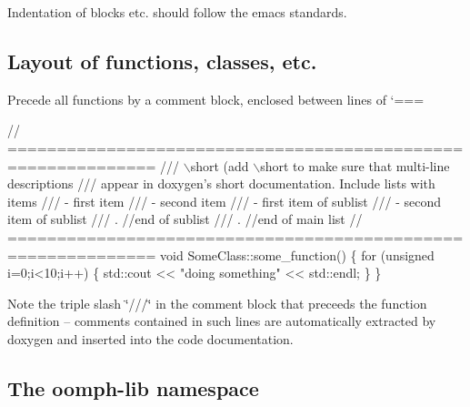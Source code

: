 \begin{DoxyItemize}
\item Indentation of blocks etc. should follow the emacs standards.
\end{DoxyItemize}\hypertarget{index_layout_functions_etc}{}\subsection{Layout of functions, classes, etc.}\label{index_layout_functions_etc}

\begin{DoxyItemize}
\item Precede all functions by a comment block, enclosed between lines of `===\textquotesingle{} 
\begin{DoxyCode}
\textcolor{comment}{// =============================================================}\textcolor{comment}{}
\textcolor{comment}{/// \(\backslash\)short (add \(\backslash\)short to make sure that multi-line descriptions}
\textcolor{comment}{/// appear in doxygen's short documentation. Include lists with items}
\textcolor{comment}{/// - first item}
\textcolor{comment}{/// - second item}
\textcolor{comment}{///   - first item of sublist}
\textcolor{comment}{///   - second item of sublist}
\textcolor{comment}{///   . //end of sublist}
\textcolor{comment}{/// . //end of main list}
\textcolor{comment}{}\textcolor{comment}{// =============================================================}
\textcolor{keywordtype}{void} SomeClass::some\_function()
\{
 \textcolor{keywordflow}{for} (\textcolor{keywordtype}{unsigned} i=0;i<10;i++)
  \{
   std::cout << \textcolor{stringliteral}{"doing something"} << std::endl;
  \}
 \}
\end{DoxyCode}
 Note the triple slash \char`\"{}///\char`\"{} in the comment block that preceeds the function definition -- comments contained in such lines are automatically extracted by doxygen and inserted into the code documentation.
\end{DoxyItemize}\hypertarget{index_oomph}{}\subsection{The oomph-\/lib namespace}\label{index_oomph}

